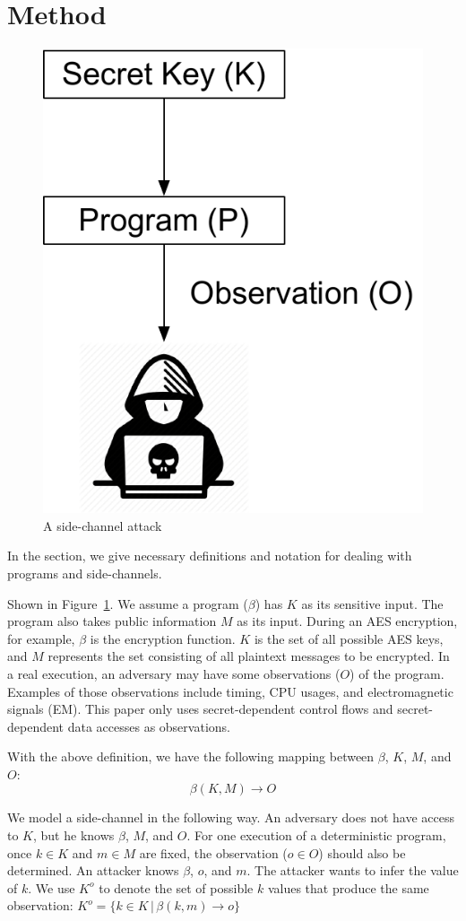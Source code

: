 \section{Method}
\begin{figure}
    \centering
    \includegraphics[width=.35\columnwidth]{./figures/chapter3/attack.pdf}
    \caption{A side-channel attack}\label{fig:side-channel-attack}
\end{figure}

In the section, we give necessary definitions and notation for dealing with
programs and side-channels. 

Shown in Figure~\ref{fig:side-channel-attack}. We assume a program ($\beta$) has $K$ as its sensitive input.  The program also takes public information $M$ as its input. During an AES encryption, for example, 
$\beta$ is the encryption function. $K$ is the set of all possible AES keys, 
and $M$ represents the set consisting of all plaintext messages to be encrypted. In a real execution, an adversary may have 
some observations ($O$) of the program. Examples of those observations include 
timing, CPU usages, and electromagnetic signals (EM). This paper only
uses secret-dependent control flows and secret-dependent data 
accesses as observations.

With the above definition, we have the following mapping between $\beta$,
$K$, $M$, and $O$:
\begin{displaymath}
    \beta(K, M) \rightarrow O
\end{displaymath}


We model a side-channel in the following way. An adversary does not have
access to $K$, but he knows $\beta$, $M$, and $O$. For one execution of a
deterministic program, once $k \in K$ and $m \in M$ are fixed, the observation
($o \in O$) should also be determined. An attacker knows $\beta$, $o$,
and $m$. The attacker wants to infer the value of $k$. We use $K^o$ to denote
the set of possible $k$ values that produce the same observation: $K^o = \{ k \in K \, |\, \beta(k, m) \rightarrow o\}$


